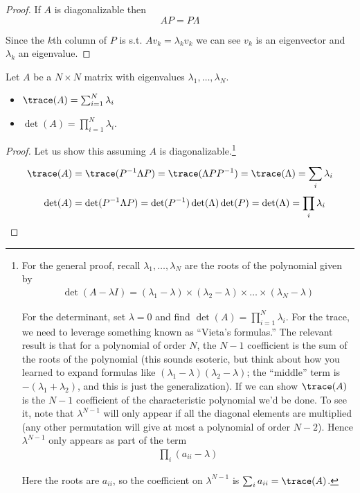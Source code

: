 \documentclass{article}
\begin{document}
\begin{proof}
  If $A$ is  diagonalizable then
  \[
    A P = P \Lambda
  \]

  Since the $k$th column of $P$ is s.t. $A v_k = \lambda_k v_k$ we can see $v_k$ is an eigenvector and $\lambda_k$ an eigenvalue.
\end{proof}

\begin{theorem}
  Let $A$ be a $N \times N$ matrix with eigenvalues $\lambda_1, \ldots, \lambda_N$.
  \begin{itemize}[label=$\bullet$]
    \item $\trace(A) = \sum^{N}_{i = 1} \lambda_i$
    \item $\det(A) = \prod_{i = 1}^N \lambda_i$.
  \end{itemize}
\end{theorem}

\begin{proof}
  Let us show this assuming $A$ is diagonalizable.\footnote{
    For the general proof, recall $\lambda_1, \ldots, \lambda_N$ are the roots of the polynomial given by
    \begin{align*}
      \det(A - \lambda I)
      =
      (\lambda_1 - \lambda)
      \times
      (\lambda_2 - \lambda)
      \times
      \ldots
      \times
      (\lambda_N - \lambda)
    \end{align*}

    For the determinant, set $\lambda = 0$ and find $\det(A) = \prod_{i = 1}^N \lambda_i$. For the trace, we need to leverage something known as ``Vieta's formulas.'' The relevant result is that for a polynomial of order $N$, the $N - 1$ coefficient is the sum of the roots of the polynomial (this sounds esoteric, but think about how you learned to expand formulas like $(\lambda_1 - \lambda) (\lambda_2 - \lambda)$; the ``middle'' term is $- (\lambda_1 + \lambda_2)$, and this is just the generalization). If we can show $\trace(A)$ is the $N - 1$ coefficient of the characteristic polynomial we'd be done. To see it, note that $\lambda^{N - 1}$ will only appear if all the diagonal elements are multiplied (any other permutation will give at most a polynomial of order $N - 2$). Hence $\lambda^{N - 1}$ only appears as part of the term
    \begin{align*}
      \prod_{i} (a_{ii} - \lambda)
    \end{align*}

    Here the roots are $a_{ii}$, so the coefficient on $\lambda^{N - 1}$ is $\sum^{}_{i} a_{ii} = \trace(A)$.
  }
  \begin{align*}
    \trace(A)
    &
    = \trace(P^{-1} \Lambda P)
    = \trace(\Lambda P P^{-1})
    = \trace(\Lambda)
    = \sum^{}_{i}  \lambda_i
    \\
    \det(A)
    &
    = \det(P^{-1} \Lambda P)
    = \det(P^{-1}) \det(\Lambda) \det(P)
    = \det(\Lambda)
    = \prod^{}_{i}  \lambda_i
  \end{align*}
\end{proof}
\end{document}
